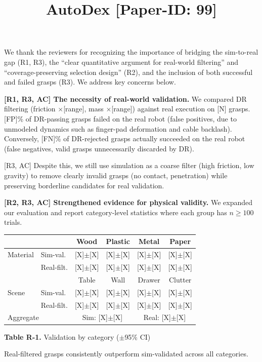 \documentclass[conference]{IEEEtran}
\newcommand{\rone}{{\color{R1}R1}}
\newcommand{\rtwo}{{\color{R2}R2}}
\newcommand{\rthree}{{\color{R3}R3}}
\newcommand{\acmark}{{\color{AC}AC}}
\newcommand{\rssparagraph}[1]{{\bf #1.}}
\begin{document}
\title{AutoDex [Paper-ID: 99]\vspace{-1cm}}
\maketitle
\thispagestyle{empty}

We thank the reviewers for recognizing the importance of bridging the sim-to-real gap ({\color{R1}R1}, {\color{R3}R3}), the ``clear quantitative argument for real-world filtering'' and ``coverage-preserving selection design'' ({\color{R2}R2}), and the inclusion of both successful and failed grasps ({\color{R3}R3}). We address key concerns below.

\rssparagraph{[\rone, \rthree, \acmark] The necessity of real-world validation}
We compared DR filtering (friction $\times$[range], mass $\times$[range]) against real execution on [N] grasps. [FP]\% of DR-passing grasps failed on the real robot (false positives, due to unmodeled dynamics such as finger-pad deformation and cable backlash). Conversely, [FN]\% of DR-rejected grasps actually succeeded on the real robot (false negatives, valid grasps unnecessarily discarded by DR).

[\rthree, \acmark] Despite this, we still use simulation as a coarse filter (high friction, low gravity) to remove clearly invalid grasps (no contact, penetration) while preserving borderline candidates for real validation.

\rssparagraph{[\rtwo, \rthree, \acmark] Strengthened evidence for physical validity}
We expanded our evaluation and report category-level statistics where each group has $n \geq 100$ trials.

\vspace{-0.2cm}
\begin{table}[h]
\centering
\scriptsize
\begin{tabular}{ll|cccc}
\toprule
& & Wood & Plastic & Metal & Paper \\
\midrule
Material & Sim-val.   & {[X]}$\pm${[X]} & {[X]}$\pm${[X]} & {[X]}$\pm${[X]} & {[X]}$\pm${[X]} \\
         & Real-filt. & {[X]}$\pm${[X]} & {[X]}$\pm${[X]} & {[X]}$\pm${[X]} & {[X]}$\pm${[X]} \\
\midrule
& & Table & Wall & Drawer & Clutter \\
\midrule
Scene    & Sim-val.   & {[X]}$\pm${[X]} & {[X]}$\pm${[X]} & {[X]}$\pm${[X]} & {[X]}$\pm${[X]} \\
         & Real-filt. & {[X]}$\pm${[X]} & {[X]}$\pm${[X]} & {[X]}$\pm${[X]} & {[X]}$\pm${[X]} \\
\midrule
\multicolumn{2}{l|}{Aggregate} & \multicolumn{2}{c}{Sim: {[X]}$\pm${[X]}} & \multicolumn{2}{c}{Real: {[X]}$\pm${[X]}} \\
\bottomrule
\end{tabular}
\vspace{6pt}

{\small \textbf{Table R-1.} Validation by category ($\pm$95\% CI)}
\label{tab:category_validation}
\end{table}
\vspace{-0.3cm}
\noindent Real-filtered grasps consistently outperform sim-validated across all categories.
\end{document}
